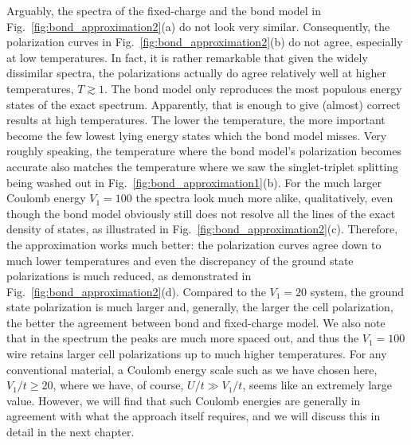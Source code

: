 Arguably, the spectra of the fixed-charge and the bond model in
Fig.~\ref{fig:bond_approximation2}(a) do not look very similar. Consequently,
the polarization curves in Fig.~\ref{fig:bond_approximation2}(b) do not agree,
especially at low temperatures. In fact, it is rather remarkable that given the
widely dissimilar spectra, the polarizations actually do agree relatively well
at higher temperatures, $T \gtrsim 1$. The bond model only reproduces the most
populous energy states of the exact spectrum. Apparently, that is enough to give
(almost) correct results at high temperatures. The lower the temperature, the
more important become the few lowest lying energy states which the bond model
misses. Very roughly speaking, the temperature where the bond model's
polarization becomes accurate also matches the temperature where we saw the
singlet-triplet splitting being washed out in
Fig.~\ref{fig:bond_approximation1}(b). For the much larger Coulomb energy $V_1 =
100$ the spectra look much more alike, qualitatively, even though the bond model
obviously still does not resolve all the lines of the exact density of states,
as illustrated in Fig.~\ref{fig:bond_approximation2}(c). Therefore, the
approximation works much better: the polarization curves agree down to much
lower temperatures and even the discrepancy of the ground state polarizations is
much reduced, as demonstrated in Fig.~\ref{fig:bond_approximation2}(d).
Compared to the $V_1 = 20$ system, the ground state polarization is much larger
and, generally, the larger the cell polarization, the better the agreement
between bond and fixed-charge model. We also note that in the spectrum the peaks
are much more spaced out, and thus the $V_1 = 100$ wire retains larger cell
polarizations up to much higher temperatures. For any conventional material, a
Coulomb energy scale such as we have chosen here, $V_1/t \ge 20$, where we have,
of course, $U/t \gg V_1/t$, seems like an extremely large value. However, we
will find that such Coulomb energies are generally in agreement with what the
 approach itself requires, and we will discuss this in detail in the
next chapter.

